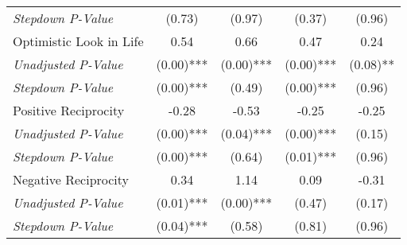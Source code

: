 \begin{tabular}{l c c c c}
\quad \textit{Stepdown P-Value} & (0.73) & (0.97) & (0.37) & (0.96) \\
Optimistic Look in Life & 0.54 & 0.66 & 0.47 & 0.24 \\
\quad \textit{Unadjusted P-Value} & (0.00)*** & (0.00)*** & (0.00)*** & (0.08)** \\
\quad \textit{Stepdown P-Value} & (0.00)*** & (0.49) & (0.00)*** & (0.96) \\
Positive Reciprocity & -0.28 & -0.53 & -0.25 & -0.25 \\
\quad \textit{Unadjusted P-Value} & (0.00)*** & (0.04)*** & (0.00)*** & (0.15) \\
\quad \textit{Stepdown P-Value} & (0.00)*** & (0.64) & (0.01)*** & (0.96) \\
Negative Reciprocity & 0.34 & 1.14 & 0.09 & -0.31 \\
\quad \textit{Unadjusted P-Value} & (0.01)*** & (0.00)*** & (0.47) & (0.17) \\
\quad \textit{Stepdown P-Value} & (0.04)*** & (0.58) & (0.81) & (0.96) \\
\bottomrule
\end{tabular}
